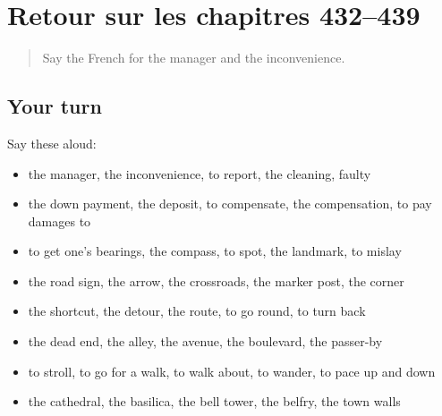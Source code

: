 \section[(dialogue)]{Retour sur les chapitres 432–439}

\label{lesson:FR-R439-revision-432-439}



\begin{quote}
Say the French for the manager and the inconvenience.
\end{quote}

\subsection*{Your turn}
Say these aloud:

\begin{itemize}
\raggedright
  \item the manager, the inconvenience, to report, the cleaning, faulty
  \item the down payment, the deposit, to compensate, the compensation, to pay damages to
  \item to get one’s bearings, the compass, to spot, the landmark, to mislay
  \item the road sign, the arrow, the crossroads, the marker post, the corner
  \item the shortcut, the detour, the route, to go round, to turn back
  \item the dead end, the alley, the avenue, the boulevard, the passer-by
  \item to stroll, to go for a walk, to walk about, to wander, to pace up and down
  \item the cathedral, the basilica, the bell tower, the belfry, the town walls
\end{itemize}

